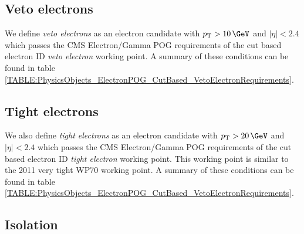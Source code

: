 \subsection{Veto electrons}

We define \textit{veto electrons} as an electron candidate with $\pt>10\,\GeV$ and $|\eta|<2.4$ which passes the \gls{CMS} Electron/Gamma \gls{POG} \cite{ARTICLE:CMSElectronReconstruction7TeV} requirements of the cut based electron \gls{ID} \textit{veto electron} working point. A summary of these conditions can be found in table \ref{TABLE:PhysicsObjects_ElectronPOG_CutBased_VetoElectronRequirements}.
 


\subsection{Tight electrons}


We also define \textit{tight electrons} as an electron candidate with $\pt>20\,\GeV$ and $|\eta|<2.4$ which passes the \gls{CMS} Electron/Gamma \gls{POG} requirements of the cut based electron \gls{ID} \textit{tight electron} working point. This working point is similar to the 2011 very tight WP70 working point. A summary of these conditions can be found in table \ref{TABLE:PhysicsObjects_ElectronPOG_CutBased_VetoElectronRequirements}.



\subsection{Isolation}
\label{SUBSECTION:EventReconstructionAndSimulation_LeptonIsolation_Isolation}


